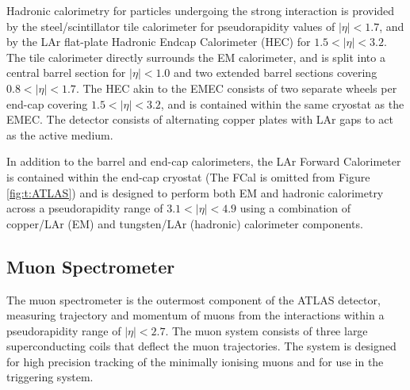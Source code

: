		Hadronic calorimetry for particles undergoing the strong interaction is provided by the steel/scintillator tile calorimeter for pseudorapidity values of $|\eta|<1.7$, and by the LAr flat-plate Hadronic Endcap Calorimeter (HEC) for $1.5<|\eta|<3.2$. The tile calorimeter directly surrounds the EM calorimeter, and is split into a central barrel section for $|\eta| < 1.0$ and two extended barrel sections covering $0.8<|\eta|<1.7$. The HEC akin to the EMEC consists of two separate wheels per end-cap covering $1.5<|\eta|<3.2$, and is contained within the same cryostat as the EMEC. The detector consists of alternating copper plates with LAr gaps to act as the active medium.

		In addition to the barrel and end-cap calorimeters, the LAr Forward Calorimeter is contained within the end-cap cryostat (The FCal is omitted from Figure \ref{fig:t:ATLAS}) and is designed to perform both EM and hadronic calorimetry across a pseudorapidity range of $3.1<|\eta|<4.9$ using a combination of copper/LAr (EM) and tungsten/LAr (hadronic) calorimeter components.

	\subsection{Muon Spectrometer}

		The muon spectrometer is the outermost component of the ATLAS detector, measuring trajectory and momentum of muons from the interactions within a pseudorapidity range of $|\eta| < 2.7$. The muon system consists of three large superconducting coils that deflect the muon trajectories. The system is designed for high precision tracking of the minimally ionising muons and for use in the triggering system.


